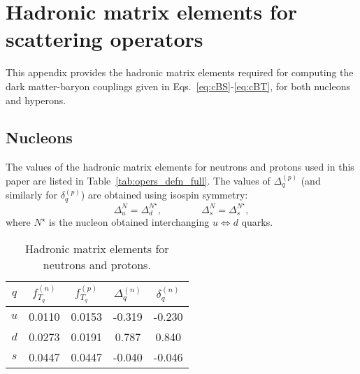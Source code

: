 \chapter{Hadronic matrix elements for scattering operators}
\label{app:hadronic_matrix_elements}

This appendix provides the hadronic matrix elements required for computing the dark matter-baryon couplings given in Eqs.~\ref{eq:cBS}-\ref{eq:cBT}, for both nucleons and hyperons.


\section{Nucleons}
The values of the hadronic matrix elements for neutrons and protons used in this paper are listed in Table~\ref{tab:opers_defn_full}. The values of $\Delta_q^{(p)}$ (and similarly for $\delta_q^{(p)}$) are obtained using isospin symmetry: 
\begin{equation}
\Delta_u^{N} =\Delta_d^{N^\star},\qquad \qquad
\Delta_s^{N} = \Delta_s^{N^\star},
\end{equation}
where $N^\star$ is the nucleon obtained interchanging $u\Longleftrightarrow d$ quarks.

\begin{table}[th]
    \centering
    \begin{tabular}{|c|c|c|c|c|}
    \hline
     $q$ & $f_{T_q}^{(n)}$ \cite{Belanger:2013oya_MicrOMEGAs3programcalculating} & $f_{T_q}^{(p)}$ \cite{Belanger:2013oya_MicrOMEGAs3programcalculating} & $\Delta^{(n)}_q$ & $\delta^{(n)}_q$ \cite{Belanger:2013oya_MicrOMEGAs3programcalculating} \\ 
     \hline
     $u$  & 0.0110 & 0.0153     & -0.319 \cite{QCDSF:2011aa_Strangenesscontributionproton} & -0.230 \\ \hline
     $d$ & 0.0273  & 0.0191     & 0.787 \cite{QCDSF:2011aa_Strangenesscontributionproton} & 0.840 \\ \hline
     $s$ & 0.0447  & 0.0447     & -0.040 \cite{Dienes:2013xya_Overcomingvelocitysuppression} & -0.046 \\ \hline
    \end{tabular}
    \caption{Hadronic matrix elements for neutrons and protons. }
    \label{tab:hadmatelem}
\end{table}

